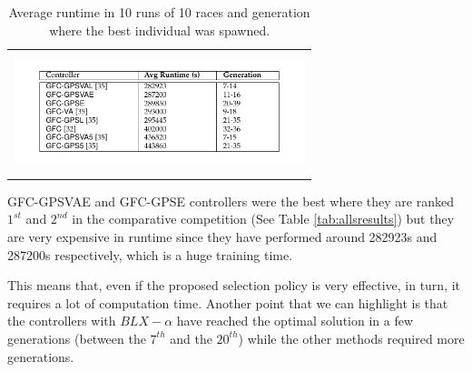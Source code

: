 \documentclass[10pt,journal,compsoc]{IEEEtran}
\begin{document}
\begin{table}[!ht]
	\centering
	{\scriptsize
          \caption{Average runtime in 10 runs of 10 races 
            and
                  generation where the best individual was spawned.}
		\label{tab:time}
				\begin{tabular}{c}
			\includegraphics[width=8.5cm, height=3.5cm, clip=true, trim=0cm 0cm 0cm 0cm]{fig/table5.pdf} 
%					
		
		\end{tabular}
		
	}
\end{table} 
{\sf GFC-GPSVAE and {\sf GFC-GPSE} controllers were the best where
they are ranked $1^{st}$ and $2^{nd}$ in the comparative competition (See Table \ref{tab:allsresults}) but they are very expensive in runtime } since they have performed around 282923s and 287200s respectively, which is a
huge training time. 
           
This means that, even if the proposed selection policy is very effective, in turn, it requires a lot of computation time.
Another point that we can highlight is that the controllers with
$BLX-\alpha$ have reached the optimal solution in a few generations
(between the $7^{th}$ and the $20^{th}$) while the other methods required more
generations. 
\end{document}
